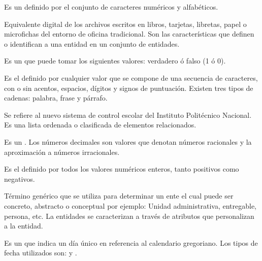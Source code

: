 \begin{bGlosario}

	 Es un  definido por el conjunto de caracteres numéricos y alfabéticos.

	 Equivalente digital de los archivos escritos en libros, tarjetas, libretas, papel o microfichas del entorno de oficina tradicional.
	 Son las características que definen o identifican a una entidad en un conjunto de entidades.
	
	 Es un  que puede tomar los siguientes valores: verdadero ó falso (1 ó 0).
	
	 Es el  definido por cualquier valor que se compone de una secuencia de caracteres, con o sin acentos, espacios, dígitos y signos de puntuación. Existen tres tipos de cadenas: palabra, frase y párrafo.
	
	 Se refiere al nuevo sistema de control escolar del Instituto Politécnico Nacional.
	 Es una lista ordenada o clasificada de elementos relacionados.
	
	 Es un  . Los números decimales son valores que denotan números racionales y la aproximación a números irracionales.
	
	 Es el   definido por todos los valores numéricos enteros, tanto positivos como negativos.
	
	 Término genérico que se utiliza para determinar un ente el cual puede ser concreto, abstracto o conceptual por ejemplo: Unidad administrativa, entregable, persona, etc. La entidades se caracterizan a través de atributos que personalizan a la entidad.	
		
	
	 Es un  que indica un día único en referencia al calendario gregoriano. Los tipos de fecha utilizados son:  y . %
	

\end{bGlosario}
